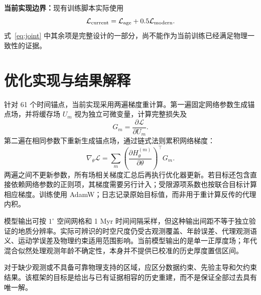 \documentclass[UTF8,zihao=-4,fontset=none,a4paper]{ctexart}
\newcommand{\loss}{\mathcal{L}}
\begin{document}
\textbf{当前实现边界：}现有训练脚本实际使用
\begin{equation}
  \loss_{\rm current}=\loss_{\rm age}+0.5\loss_{\rm modern}.
  \label{eq:current}
\end{equation}
式~\eqref{eq:joint} 中其余项是完整设计的一部分，尚不能作为当前训练已经满足物理一致性的证据。

\section{优化实现与结果解释}

针对 61 个时间锚点，当前实现采用两遍梯度重计算。第一遍固定网络参数生成锚点场，并将缓存场 $U_m$ 视为独立可微变量，计算完整损失及
\begin{equation}
  G_m=\frac{\partial\loss}{\partial U_m}.
\end{equation}
第二遍在相同参数下重新生成锚点场，通过链式法则累积网络梯度：
\begin{equation}
  \nabla_\theta\loss
  =\sum_m
  \left(\frac{\partial H_\theta^{(m)}}{\partial\theta}\right)^{\!\top}G_m.
  \label{eq:gradient}
\end{equation}
两遍之间不更新参数，所有场相关梯度汇总后再执行优化器更新。若目标还包含直接依赖网络参数的正则项，其梯度需要另行计入；受限源项系数也按联合目标计算相应梯度。训练使用 AdamW；日志记录原始目标值，而非用于重计算反传的代理内积。

模型输出可按 $1^\circ$ 空间网格和 1 Myr 时间间隔采样，但这种输出间距不等于独立验证的地质分辨率。实际可辨识的时空尺度仍受古观测覆盖、年龄误差、代理观测语义、运动学误差及物理约束适用范围影响。当前模型输出的是单一正厚度场；年代混合似然处理观测年龄不确定性，本身并不提供已校准的历史厚度置信区间。

对于缺少观测或不具备可靠物理支持的区域，应区分数据约束、先验主导和欠约束结果。该框架的目标是给出与已有证据相容的历史重建，而不是保证全部过去具有唯一解。
\end{document}
